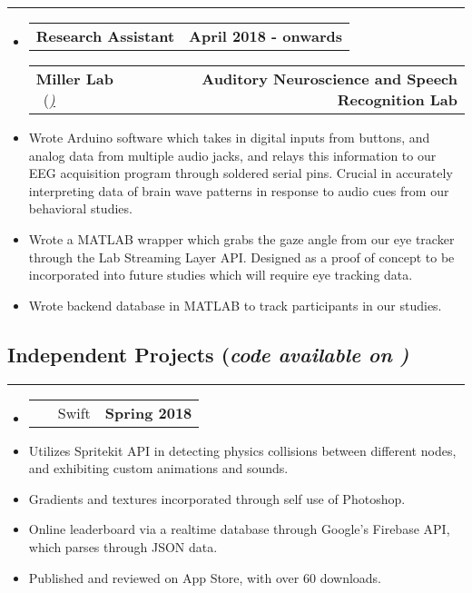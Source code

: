 \documentclass[10pt,letterpaper]{article}
\makeatletter
\newcommand{\header}[2]
{
	\begin{tabular*}{\linewidth}{l @{\extracolsep{\fill}} r}
		#1 & #2 \\
	\end{tabular*}
}
\newcommand{\sectionbreak}
{
	\vspace{-1.2em}
	\rule{\textwidth}{1.7pt}
	\vspace{-1.7em}
}
\makeatother
\begin{document}
\hrule

\begin{itemize}
	\item[]
		\header
			{\textbf{Research Assistant}} 
			{\textbf{April 2018 - onwards}}
		\header
		{\textbf{Miller Lab} \ (\href{https://millerlab.faculty.ucdavis.edu}{\small \emph{\underline{\smash{millerlab.faculty.ucdavis.edu})}} } }
			{\textbf{Auditory Neuroscience and Speech Recognition Lab}} 
		\item
			Wrote Arduino software which takes in digital inputs from buttons, and analog data from multiple audio jacks, and relays this information to our EEG acquisition program through soldered serial pins. Crucial in accurately interpreting data of brain wave patterns in response to audio cues from our behavioral studies.
		\item 
			Wrote a MATLAB wrapper which grabs the gaze angle from our eye tracker through the Lab Streaming Layer API. Designed as a proof of concept to be incorporated into future studies which will require eye tracking data.
		\item
			Wrote backend database in MATLAB to track participants in our studies.
\end{itemize}

\vspace{-1.5em}

\subsection*{Independent Projects (\emph{code available on \emph{\href{https://github.com/aashpointo}{\emph{\underline{}}}})}}
\sectionbreak

	

\begin{itemize}
	\item[]
		\header 
		{
			\href{https://itunes.apple.com/us/app/round-bound/id1369632746?mt=8}{\emph{\underline{\smash{\textbf{Round 'a Bound}}}}} \ \ \ \footnotesize Swift
		}
			{\textbf{Spring 2018}}
		\item 
			Utilizes Spritekit API in detecting physics collisions between different nodes, and exhibiting custom animations and sounds.
		\item
			Gradients and textures incorporated through self use of Photoshop.
		\item
			Online leaderboard via a realtime database through Google's Firebase API, which parses through JSON data. 
		\item
			Published and reviewed on App Store, with over 60 downloads. 
\end{itemize}
\end{document}
